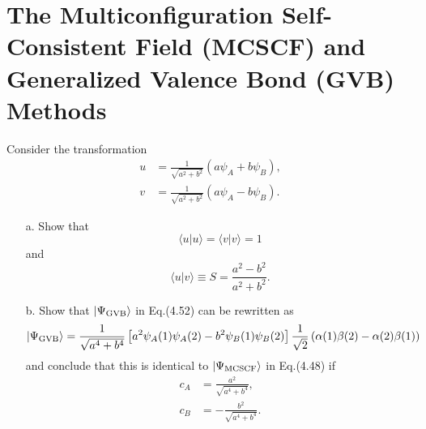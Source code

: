 \documentclass[a4paper]{book}
\begin{document}
	\section{The Multiconfiguration Self-Consistent Field (MCSCF) and \texorpdfstring{\\}- Generalized Valence Bond (GVB) Methods}	
	
	\begin{exercise}
	Consider the transformation
	\begin{align*}
		u &= \frac{1}{\sqrt{ a^2 + b^2 }} \left( a \psi_A + b \psi_B \right), \\
		v &= \frac{1}{\sqrt{ a^2 + b^2 }} \left( a \psi_A - b \psi_B \right).
	\end{align*}
	\begin{enumerate}
	
	\item[a.] Show that
	\[
		\langle u | u \rangle = \langle v | v \rangle = 1
	\]
	and
	\[
		\langle u | v \rangle \equiv S = \frac{ a^2 - b^2 }{ a^2 + b^2 }.
	\]
	
	\item[b.] Show that $|\Psi_{\rm GVB}\rangle$ in Eq.(4.52) can be rewritten as
	\[
		|\Psi_{\rm GVB}\rangle = \frac{1}{\sqrt{ a^4 + b^4 }} \left[ a^2 \psi_A(1) \psi_A(2) - b^2 \psi_B(1) \psi_B(2) \right] \frac{1}{\sqrt{2}} \left( \alpha(1)\beta(2) - \alpha(2)\beta(1) \right)
	\]
	and conclude that this is identical to $|\Psi_{\rm MCSCF}\rangle$ in Eq.(4.48) if
	\begin{align*}
		c_A &= \frac{ a^2 }{ \sqrt{ a^4 + b^4 } }, \\
		c_B &= -\frac{ b^2 }{ \sqrt{ a^4 + b^4 } }.
	\end{align*}
	\end{enumerate}		
	\end{exercise}
	
\end{document}
